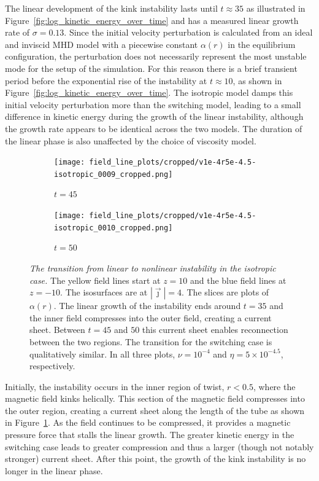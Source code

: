 The linear development of the kink instability lasts until $t\approx 35$ as illustrated in   Figure~\ref{fig:log_kinetic_energy_over_time} and has a measured linear growth rate of $\sigma = 0.13$. Since the initial velocity perturbation is calculated from an ideal and inviscid MHD model with a piecewise constant $\alpha(r)$ in the equilibrium configuration, the perturbation does not necessarily represent the most unstable mode for the setup of the simulation. For this reason there is a brief transient period before the exponential rise of the instability at $t\approx10$, as shown in Figure~\ref{fig:log_kinetic_energy_over_time}. The isotropic model damps this initial velocity perturbation more than the switching model, leading to a small difference in kinetic energy during the growth of the linear instability, although the growth rate appears to be identical across the two models. The duration of the linear phase is also unaffected by the choice of viscosity model.

\begin{figure}[t]
  \centering
    \begin{subfigure}{0.49\textwidth}
      \texttt{[image: field\_line\_plots/cropped/v1e-4r5e-4.5-isotropic\_0009\_cropped.png]}
      \caption{$t=45$}
      \label{fig:field_lines_0009}
    \end{subfigure}
    \begin{subfigure}{0.49\textwidth}
      \texttt{[image: field\_line\_plots/cropped/v1e-4r5e-4.5-isotropic\_0010\_cropped.png]}
      \caption{$t=50$}
      \label{fig:field_lines_0010}
    \end{subfigure}
\caption{\textit{The transition from linear to nonlinear instability in the isotropic case.} The yellow field lines start at $z=10$ and the blue field lines at $z=-10$. The isosurfaces are at $|\vec{\jmath}| = 4$. The slices are plots of $\alpha(r)$. The linear growth of the instability ends around $t=35$ and the inner field compresses into the outer field, creating a current sheet. Between $t=45$ and $50$ this current sheet enables reconnection between the two regions. The transition for the switching case is qualitatively similar. In all three plots, $\nu = 10^{-4}$ and $\eta = 5\times 10^{-4.5}$, respectively.}
\label{fig:reconnecting_field_lines}%
\end{figure}

Initially, the instability occurs in the inner region of twist, $r<0.5$, where the magnetic field kinks helically. This section of the magnetic field compresses into the outer region, creating a current sheet along the length of the tube as shown in Figure~\ref{fig:field_lines_0009}. As the field continues to be compressed, it provides a magnetic pressure force that stalls the linear growth. The greater kinetic energy in the switching case leads to greater compression and thus a larger (though not notably stronger) current sheet. After this point, the growth of the kink instability is no longer in the linear phase.


